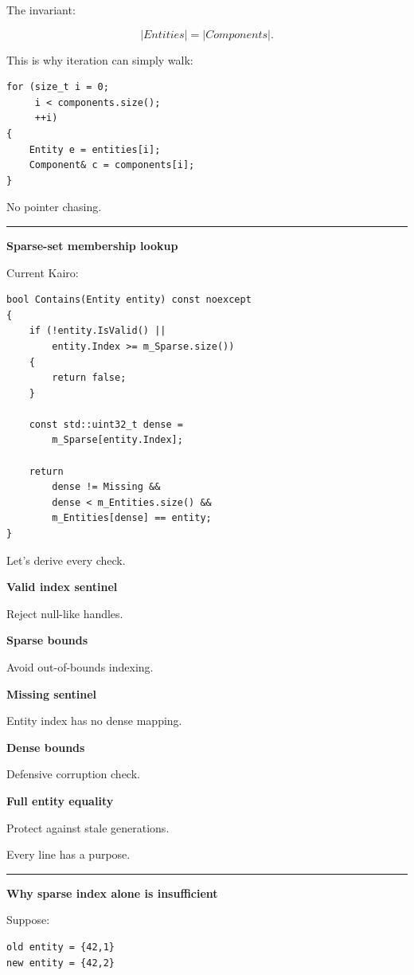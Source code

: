 The invariant:

\[
|Entities|=|Components|.
\]

This is why iteration can simply walk:

\begin{verbatim}
for (size_t i = 0;
     i < components.size();
     ++i)
{
    Entity e = entities[i];
    Component& c = components[i];
}
\end{verbatim}

No pointer chasing.

\begin{center}\rule{0.5\linewidth}{0.5pt}\end{center}

\textbf{Sparse-set membership lookup}

Current Kairo:

\begin{verbatim}
bool Contains(Entity entity) const noexcept
{
    if (!entity.IsValid() ||
        entity.Index >= m_Sparse.size())
    {
        return false;
    }

    const std::uint32_t dense =
        m_Sparse[entity.Index];

    return
        dense != Missing &&
        dense < m_Entities.size() &&
        m_Entities[dense] == entity;
}
\end{verbatim}

Let's derive every check.

\textbf{Valid index sentinel}

Reject null-like handles.

\textbf{Sparse bounds}

Avoid out-of-bounds indexing.

\textbf{Missing sentinel}

Entity index has no dense mapping.

\textbf{Dense bounds}

Defensive corruption check.

\textbf{Full entity equality}

Protect against stale generations.

Every line has a purpose.

\begin{center}\rule{0.5\linewidth}{0.5pt}\end{center}

\textbf{Why sparse index alone is insufficient}

Suppose:

\begin{verbatim}
old entity = {42,1}
new entity = {42,2}
\end{verbatim}

